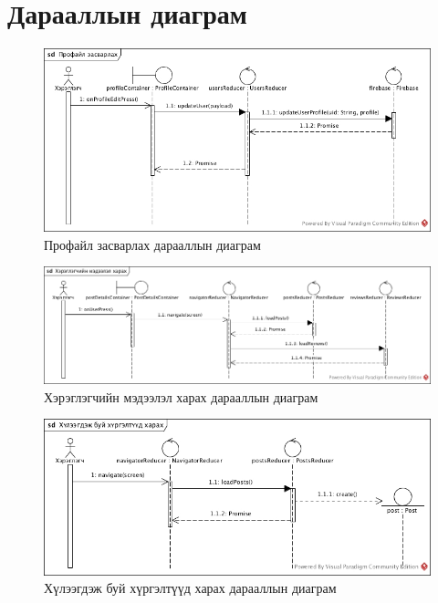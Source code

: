 \section{Дарааллын диаграм}

\begin{figure}[H]
	\centering
	\includegraphics[width=\textwidth]{Figures/zohiomj/seq/profile_zasvarlah.jpg}
	\caption{Профайл засварлах дарааллын диаграм}
\end{figure}

\begin{figure}[H]
	\centering
	\includegraphics[width=\textwidth]{Figures/zohiomj/seq/hereglegchiin_medeelel_harah.jpg}
	\caption{Хэрэглэгчийн мэдээлэл харах дарааллын диаграм}
\end{figure}

\begin{figure}[H]
	\centering
	\includegraphics[width=\textwidth]{Figures/zohiomj/seq/huleegdej_bui_hurgelt_harah.jpg}
	\caption{Хүлээгдэж буй хүргэлтүүд харах дарааллын диаграм}
\end{figure}

